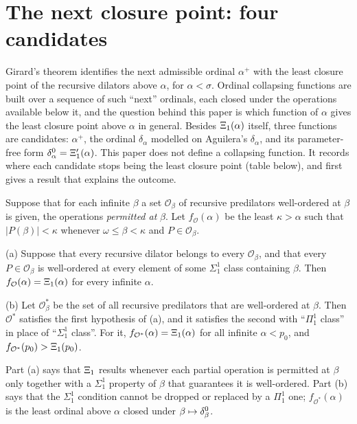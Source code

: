 \documentclass[11pt]{article}
\begin{document}
\section{The next closure point: four candidates}

Girard's theorem identifies the next admissible ordinal $\alpha^+$ with the least closure point of the recursive
dilators above $\alpha$, for $\alpha < \sigma$. Ordinal collapsing functions are built over a sequence of such
``next'' ordinals, each closed under the operations available below it, and the question behind this paper is
which function of $\alpha$ gives the least closure point above $\alpha$ in general. Besides $\Xi_1(\alpha)$ itself,
three functions are candidates: $\alpha^+$, the ordinal $\delta_{\alpha}$ modelled on Aguilera's $\delta_{\alpha}$, and its
parameter-free form $\delta^0_{\alpha} = \Xi'_1(\alpha)$. This paper does not define a collapsing function. It records where
each candidate stops being the least closure point (table below), and first gives a result that explains the outcome.

Suppose that for each infinite $\beta$ a set $\mathcal O_\beta$ of recursive predilators
well-ordered at $\beta$ is given, the operations \emph{permitted at} $\beta$. Let $f_{\mathcal O}(\alpha)$ be the
least $\kappa > \alpha$ such that $|P(\beta)| < \kappa$ whenever $\omega \le \beta < \kappa$ and
$P \in \mathcal O_\beta$.

\begin{statement} (a) Suppose that every recursive dilator belongs to every $\mathcal O_\beta$, and
that every $P \in \mathcal O_\beta$ is well-ordered at every element of some $\Sigma^1_1$ class containing $\beta$.
Then $f_{\mathcal O}(\alpha) = \Xi_1(\alpha)$ for every infinite $\alpha$.

(b) Let $\mathcal O^*_\beta$ be the set of all recursive predilators that are well-ordered at $\beta$. Then
$\mathcal O^*$ satisfies the first hypothesis of (a), and it satisfies the second with ``$\Pi^1_1$ class'' in
place of ``$\Sigma^1_1$ class''. For it, $f_{\mathcal O^*}(\alpha) = \Xi_1(\alpha)$ for all infinite
$\alpha < p_0$, and $f_{\mathcal O^*}(p_0) > \Xi_1(p_0)$.
\end{statement}

Part (a) says that $\Xi_1$ results whenever each partial operation is permitted at $\beta$ only together with a
$\Sigma^1_1$ property of $\beta$ that guarantees it is well-ordered. Part (b) says that the $\Sigma^1_1$ condition
cannot be dropped or replaced by a $\Pi^1_1$ one; $f_{\mathcal O^*}(\alpha)$ is the least ordinal above $\alpha$
closed under $\beta \mapsto \delta^0_{\beta}$.
\end{document}
